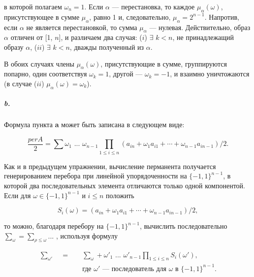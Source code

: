 \documentclass{../../template/mai_book}
\begin{document}
\noindent
в которой полагаем $\omega_n = 1$. Если $\alpha$ — перестановка, то каждое $\mu_\alpha(\omega)$, присутствующее в сумме $\mu_\alpha$, равно 1 и, следовательно, $\mu_\alpha = 2^{n - 1}$. Напротив, если $\alpha$ не является перестановкой, то сумма $\mu_\alpha$ — нулевая. Действительно, образ $\alpha$ отличен от [1, $n$], и различаем два случая: \newline
\indent ($i$) $\exists$ $k < n$, не принадлежащий образу $\alpha$, \newline
\indent ($ii$) $\exists$ $k < n$, дважды полученный из $\alpha$.

В обоих случаях члены $\mu_\alpha(\omega)$, присутствующие в сумме, группируются попарно, один соответствуя $\omega_k = 1$, другой — $\omega_k = -1$, и взаимно уничтожаются (в случае ($ii$) $\mu_\alpha(\omega) = \omega_k$).

\subparagraph{b.} Формула пункта \textbf{a} может быть записана в следующем виде:

\begin{equation*}
\frac{per A}{2} = \sum \omega_1 \text{ ... } \omega_{n - 1} \prod_{1 \leqslant i \leqslant n} (a_{in} + \omega_1 a_{i1} + \cdots + \omega_{n - 1} a_{in - 1})/2.
\end{equation*}

\noindent
Как и в предыдущем упражнении, вычисление перманента получается генерированием перебора при линейной упорядоченности на $\{-1, 1\}^{n - 1}$, в которой два последовательных элемента отличаются только одной компонентой. Если для $\omega \in \{-1, 1\}^{n - 1}$ и $i \leqslant n$ положить

\begin{equation*}
S_i(\omega) = (a_{in} + \omega_1 a_{i1} + \cdots + \omega_{n - 1} a_{in - 1})/2,
\end{equation*}

\newpage


\noindent
то можно, благодаря перебору на $\{-1, 1\}^{n - 1}$, вычислить последовательно ${\sum}_\omega = {\sum}_{\rho \leqslant \omega}$... , используя формулу

\begin{equation}
	\begin{split}
	{\sum}_{\omega'} \quad = \quad &{\sum}_\omega + {\omega'}_1 \text{ ... } {\omega'}_{n - 1} \prod_{1 \leqslant i \leqslant n} S_i(\omega'),
	\\
	&\text{где } \omega' \text{ — последователь для } \omega \text{ в } \{-1, 1\}^{n - 1}.
	\end{split}
\end{equation}
\end{document}
